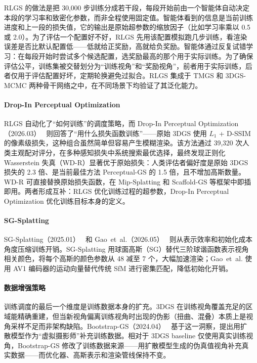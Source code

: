 RLGS 的做法是把 30,000 步训练分成若干段，每段开始前由一个智能体自动决定本段的学习率和致密化参数，而非全程使用固定值。智能体看到的信息是当前训练进度和上一段的损失值，它的输出是原始超参数的缩放因子（比如学习率乘以 0.5 或 2.0）。为了评估一个配置好不好，RLGS 先用该配置模拟跑几步训练，看渲染误差是否比默认配置低——低就给正奖励，高就给负奖励。智能体通过反复试错学习：在每段开始时尝试多个候选配置，选奖励最高的那个用于实际训练。为了确保评估公平，训练集被交替划分为``训练视角''和``奖励视角''，前者用于实际训练，后者仅用于评估配置好坏，定期轮换避免过拟合。RLGS 集成于 TMGS 和 3DGS-MCMC 两种骨干网络之中，在不同场景下均验证了其泛化能力。

\paragraph{Drop-In Perceptual Optimization}
RLGS 自动化了``如何训练''的调度策略，而 Drop-In Perceptual Optimization（2026.03）~\cite{2603_23297} 则回答了``用什么损失函数训练''——原始 3DGS 使用 $L_1$ + D-SSIM 的像素级损失，这种组合虽然简单但容易产生模糊渲染。该方法通过 39,320 次人类主观配对评分，在多种感知损失中系统搜索最优选择，最终发现正则化 Wasserstein 失真（WD-R）显著优于原始损失：人类评估者偏好度是原始 3DGS 损失的 2.3 倍、是当前最佳方法 Perceptual-GS 的 1.5 倍，且不增加高斯数量。WD-R 可直接替换原始损失函数，在 Mip-Splatting 和 Scaffold-GS 等框架中即插即用。两者形成互补：RLGS 优化训练过程的超参数，Drop-In Perceptual Optimization 优化训练目标本身的定义。

\paragraph{SG-Splatting}
SG-Splatting（2025.01）~\cite{2501_00342} 和 Gao~et~al.（2026.05）~\cite{2605_14629} 则从表示效率和初始化成本角度压缩训练开销。SG-Splatting 用球面高斯（SG）替代三阶球谐函数表示视角相关颜色，将每个高斯的颜色参数从 48 减至 7 个，大幅加速渲染；Gao~et~al. 使用 AV1 编码器的运动向量替代传统 SfM 进行密集匹配，降低初始化开销。

\paragraph{数据增强策略}

训练调度的最后一个维度是训练数据本身的扩充。3DGS 在训练视角覆盖充足的区域能精确重建，但当新视角偏离训练视角时出现的伪影（扭曲、混叠）本质上是视角采样不足而非架构缺陷。Bootstrap-GS（2024.04）~\cite{2404_18669} 基于这一洞察，提出用扩散模型作为``虚拟摄影师''补充训练数据。相对于 3DGS baseline 仅使用真实训练视角，Bootstrap-GS 修改了训练数据来源——用扩散模型生成的伪真值视角补充真实数据——而优化器、高斯表示和渲染管线保持不变。

